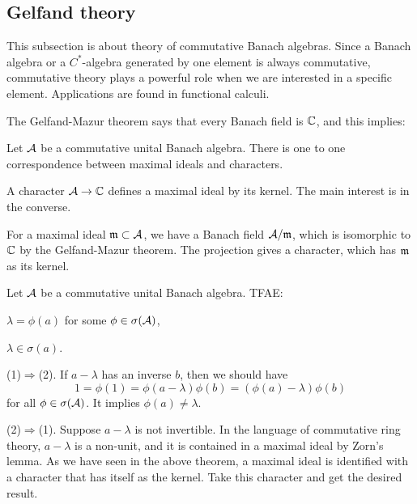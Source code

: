 \documentclass{../crs}
\begin{document}
\subsection{Gelfand theory}
This subsection is about theory of commutative Banach algebras.
Since a Banach algebra or a $C^*$-algebra generated by one element is always commutative, commutative theory plays a powerful role when we are interested in a specific element.
Applications are found in functional calculi.

The Gelfand-Mazur theorem says that every Banach field is $\mathbb{C}$, and this implies:
\begin{thm}
Let $\mathcal{A}$ be a commutative unital Banach algebra.
There is one to one correspondence between maximal ideals and characters.
\end{thm}
\begin{pf}
A character $\mathcal{A}\to\mathbb{C}$ defines a maximal ideal by its kernel.
The main interest is in the converse.

For a maximal ideal $\mathfrak{m}\subset\mathcal{A}$, we have a Banach field $\mathcal{A}/\mathfrak{m}$, which is isomorphic to $\mathbb{C}$ by the Gelfand-Mazur theorem.
The projection gives a character, which has $\mathfrak{m}$ as its kernel.
\end{pf}

\begin{thm}
Let $\mathcal{A}$ be a commutative unital Banach algebra.
TFAE:
\begin{cond}
\item $\lambda=\phi(a)$ for some $\phi\in\sigma(\mathcal{A})$,
\item $\lambda\in\sigma(a)$.
\end{cond}
\end{thm}
\begin{pf}
(1)$\Rightarrow$(2).
If $a-\lambda$ has an inverse $b$, then we should have
\[1=\phi(1)=\phi(a-\lambda)\phi(b)=(\phi(a)-\lambda)\phi(b)\]
for all $\phi\in\sigma(\mathcal{A})$.
It implies $\phi(a)\ne\lambda$.

(2)$\Rightarrow$(1).
Suppose $a-\lambda$ is not invertible.
In the language of commutative ring theory, $a-\lambda$ is a non-unit, and it is contained in a maximal ideal by Zorn's lemma.
As we have seen in the above theorem, a maximal ideal is identified with a character that has itself as the kernel.
Take this character and get the desired result.
\end{pf}
\end{document}
